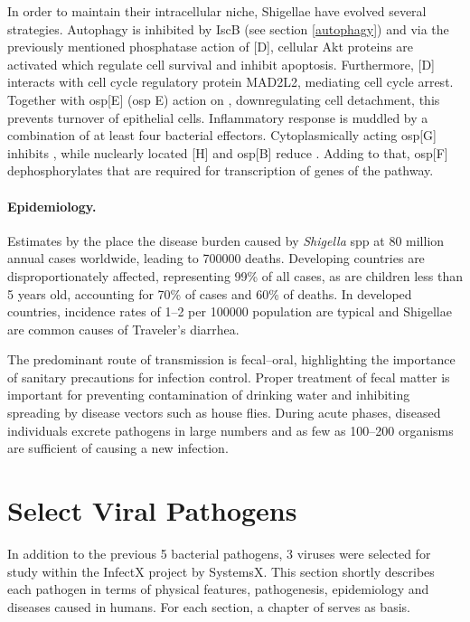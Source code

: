 In order to maintain their intracellular niche, Shigellae have evolved several strategies. Autophagy is inhibited by IscB (see section \ref{autophagy}) and via the previously mentioned phosphatase action of [D], cellular Akt proteins are activated which regulate cell survival and inhibit apoptosis. Furthermore, [D] interacts with cell cycle regulatory protein MAD2L2, mediating cell cycle arrest. Together with \acrshort{osp}[E] (\acrlong{osp} E) action on , downregulating cell detachment, this prevents turnover of epithelial cells. Inflammatory response is muddled by a combination of at least four bacterial effectors. Cytoplasmically acting \acrshort{osp}[G] inhibits , while nuclearly located [H] and \acrshort{osp}[B] reduce . Adding to that, \acrshort{osp}[F] dephosphorylates  that are required for transcription of genes of the  pathway.

\paragraph{Epidemiology.}
Estimates by the  place the disease burden caused by \textit{Shigella} \acrshort{spp} at 80 million annual cases worldwide, leading to 700000 deaths. Developing countries are disproportionately affected, representing 99\% of all cases, as are children less than 5 years old, accounting for 70\% of cases and 60\% of deaths. In developed countries, incidence rates of 1--2 per 100000 population are typical and Shigellae are common causes of Traveler's diarrhea.

The predominant route of transmission is fecal--oral, highlighting the importance of sanitary precautions for infection control. Proper treatment of fecal matter is important for preventing contamination of drinking water and inhibiting spreading by disease vectors such as house flies. During acute phases, diseased individuals excrete pathogens in large numbers and as few as 100--200 organisms are sufficient of causing a new infection.

\section{Select Viral Pathogens}

In addition to the previous 5 bacterial pathogens, 3 viruses were selected for study within the InfectX  project by SystemsX. This section shortly describes each pathogen in terms of physical features, pathogenesis, epidemiology and diseases caused in humans. For each section, a chapter of \citet{Craighead2000} serves as basis.

